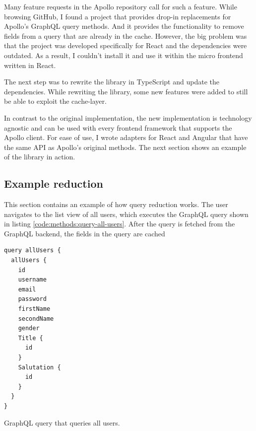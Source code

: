 \documentclass[MSE,Master,english]{twbook}%
\begin{document}
\fi

Many feature requests in the Apollo repository call for such a feature. While browsing GitHub, I found a project that provides drop-in replacements for Apollo's GraphQL query methods. And it provides the functionality to remove fields from a query that are already in the cache. However, the big problem was that the project was developed specifically for React and the dependencies were outdated. As a result, I couldn't install it and use it within the micro frontend written in React.

The next step was to rewrite the library in TypeScript and update the dependencies. While rewriting the library, some new features were added to still be able to exploit the cache-layer.


In contrast to the original implementation, the new implementation is technology agnostic and can be used with every frontend framework that supports the Apollo client. For ease of use, I wrote adapters for React and Angular that have the same API as Apollo's original methods. The next section shows an example of the library in action.

\subsection{Example reduction}

This section contains an example of how query reduction works. The user navigates to the list view of all users, which executes the GraphQL query shown in listing \ref{code:methods:query-all-users}. After the query is fetched from the GraphQL backend, the fields in the query are cached

\ifshowListings
\begin{listing}[H]
\begin{verbatim}
query allUsers {
  allUsers {
    id
    username
    email
    password
    firstName
    secondName
    gender
    Title {
      id
    }
    Salutation {
      id
    }
  }
}
\end{verbatim}
\caption{GraphQL query that queries all users.}\label{code:methods:query-all-users}
\end{listing}
\fi
\end{document}
